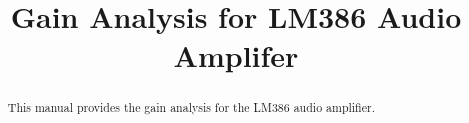 \documentclass[journal,12pt,twocolumn]{IEEEtran}
\begin{document}
\let\StandardTheFigure\thefigure
\renewcommand{\thefigure}{\theproblem}



\makeatletter
{}
\makeatother

\let\StandardTheFigure\thefigure
\let\StandardTheTable\thetable





\def\putbox#1#2#3{\makebox[0in][l]{\makebox[#1][l]{}\raisebox{\baselineskip}[0in][0in]{\raisebox{#2}[0in][0in]{#3}}}}
     \def\rightbox#1{\makebox[0in][r]{#1}}
     \def\centbox#1{\makebox[0in]{#1}}
     \def\topbox#1{\raisebox{-\baselineskip}[0in][0in]{#1}}
     \def\midbox#1{\raisebox{-0.5\baselineskip}[0in][0in]{#1}}

\vspace{3cm}
\title{ 
	{
Gain Analysis for LM386 Audio Amplifer 
	}
}

\maketitle
\tableofcontents
\bigskip

\begin{abstract}
This manual provides the gain analysis for the LM386 audio amplifier. 
\end{abstract}
\end{document}
